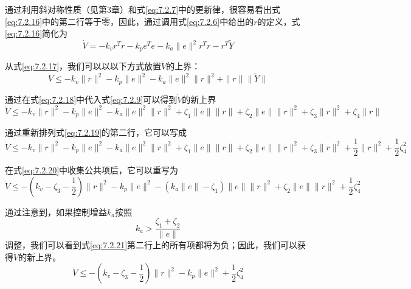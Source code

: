 \documentclass[UTF8]{ctexart}
\begin{document}
通过利用斜对称性质（见第3章）和式\eqref{eq:7.2.7}中的更新律，很容易看出式\eqref{eq:7.2.16}中的第二行等于零，因此，通过调用式\eqref{eq:7.2.6}中给出的$r$的定义，式\eqref{eq:7.2.16}简化为
\begin{equation}\label{eq:7.2.17}
\dot{V} = -k_v r^T r - k_p e^T e - k_a\|e\|^2r^T r - r^T\tilde{Y}
\end{equation}

从式\eqref{eq:7.2.17}，我们可以以以下方式放置$\dot{V}$的上界：
\begin{equation}\label{eq:7.2.18}
\dot{V} \leq -k_v \|r\|^2 - k_p \|e\|^2 - k_a\|e\|^2\|r\|^2 + \|r\|\|\tilde{Y}\|
\end{equation}

通过在式\eqref{eq:7.2.18}中代入式\eqref{eq:7.2.9}可以得到$\dot{V}$的新上界
\begin{equation}\label{eq:7.2.19}
\dot{V} \leq -k_v \|r\|^2 - k_p \|e\|^2 - k_a\|e\|^2\|r\|^2 + \zeta_1\|e\|\|r\| + \zeta_2\|e\|\|r\|^2 + \zeta_3\|r\|^2 + \zeta_4\|r\|
\end{equation}

通过重新排列式\eqref{eq:7.2.19}的第二行，它可以写成
\begin{equation}\label{eq:7.2.20}
\dot{V} \leq -k_v \|r\|^2 - k_p \|e\|^2 - k_a\|e\|^2\|r\|^2 + \zeta_1\|e\|\|r\| + \zeta_2\|e\|\|r\|^2 + \zeta_3\|r\|^2 + \frac{1}{2}\|r\|^2 + \frac{1}{2}\zeta_4^2
\end{equation}

在式\eqref{eq:7.2.20}中收集公共项后，它可以重写为
\begin{equation}\label{eq:7.2.21}
\dot{V} \leq -(k_v - \zeta_3 - \frac{1}{2})\|r\|^2 - k_p\|e\|^2 - (k_a\|e\| - \zeta_1)\|e\|\|r\|^2 + \zeta_2\|e\|\|r\|^2 + \frac{1}{2}\zeta_4^2
\end{equation}

通过注意到，如果控制增益$k_a$按照
\begin{equation}\label{eq:7.2.22}
k_a > \frac{\zeta_1 + \zeta_2}{\|e\|}
\end{equation}
调整，我们可以看到式\eqref{eq:7.2.21}第二行上的所有项都将为负；因此，我们可以获得$\dot{V}$的新上界。
\begin{equation}\label{eq:7.2.23}
\dot{V} \leq -(k_v - \zeta_3 - \frac{1}{2})\|r\|^2 - k_p\|e\|^2 + \frac{1}{2}\zeta_4^2
\end{equation}
\end{document}
